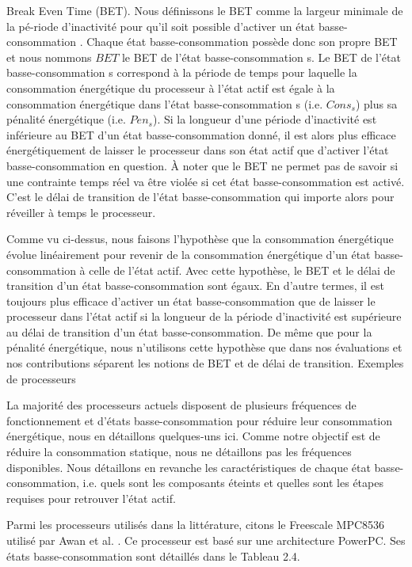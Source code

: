 Break Even Time (BET). Nous définissons le BET comme la largeur minimale de la pé-riode d’inactivité pour qu’il soit possible d’activer un état basse-consommation \cite{AP11, CG06, DA08a}.
 Chaque état basse-consommation possède donc son propre BET et nous nommons $BET$ le BET de l’état basse-consommation s. 
 Le BET de l’état basse-consommation s correspond à la période de temps pour laquelle la consommation énergétique du processeur à l’état actif est égale à la consommation énergétique
 dans l’état basse-consommation s (i.e. $Cons_s$) plus sa pénalité énergétique (i.e. $Pen_s$). Si la longueur d’une période d’inactivité est inférieure au BET d’un état basse-consommation
 donné, il est alors plus eﬃcace énergétiquement de laisser le processeur dans son état actif que d’activer l’état basse-consommation en question. À noter que le BET ne permet pas de savoir 
 si une contrainte temps réel va être violée si cet état basse-consommation est activé. C’est le délai de transition de l’état basse-consommation qui importe alors pour réveiller à temps le processeur.

Comme vu ci-dessus, nous faisons l’hypothèse que la consommation énergétique évolue linéairement pour revenir de la consommation énergétique d’un état basse-consommation à celle de l’état actif. 
Avec cette hypothèse, le BET et le délai de transition d’un état basse-consommation sont égaux. 
En d’autre termes, il est toujours plus eﬃcace d’activer un état basse-consommation que de laisser le processeur dans l’état actif si la longueur de la période d’inactivité 
est supérieure au délai de transition d’un état basse-consommation. De même que pour la pénalité énergétique, nous n’utilisons cette hypothèse que dans nos évaluations et 
nos contributions séparent les notions de BET et de délai de transition.
Exemples de processeurs

La majorité des processeurs actuels disposent de plusieurs fréquences de fonctionnement et d’états basse-consommation pour réduire leur consommation énergétique, nous en détaillons quelques-uns ici. Comme notre objectif est de réduire la consommation statique, nous ne détaillons pas les fréquences disponibles. Nous détaillons en revanche les caractéristiques de chaque état basse-consommation, i.e. quels sont les composants éteints et quelles sont les étapes requises pour retrouver l’état actif.

Parmi les processeurs utilisés dans la littérature, citons le Freescale MPC8536 \cite{MPC} utilisé par Awan et al. \cite{AP11, AP13, AYP13}. Ce processeur est basé sur une architecture PowerPC. Ses états basse-consommation sont détaillés dans le Tableau 2.4.

